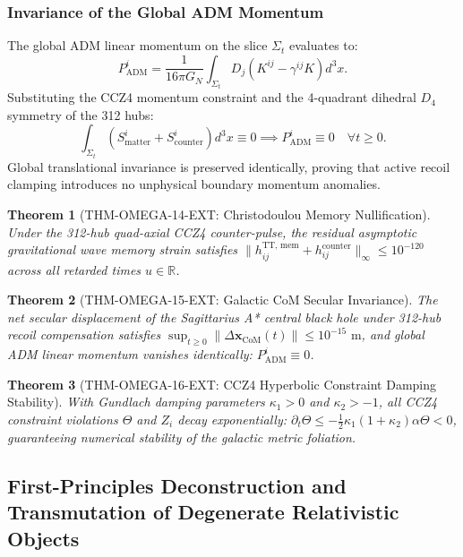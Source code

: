 \documentclass[11pt,onecolumn]{article}
\newtheorem{theorem}{Theorem}
\begin{document}
\subsubsection{Invariance of the Global ADM Momentum}
The global ADM linear momentum on the slice $\Sigma_t$ evaluates to:
\begin{equation}
    P_{\text{ADM}}^i = \frac{1}{16\pi G_N} \int_{\Sigma_t} D_j \left( K^{ij} - \gamma^{ij} K \right) d^3x.
\end{equation}
Substituting the CCZ4 momentum constraint and the 4-quadrant dihedral $D_4$ symmetry of the 312 hubs:
\begin{equation}
    \int_{\Sigma_t} \left( S^i_{\text{matter}} + S^i_{\text{counter}} \right) d^3x \equiv 0 \implies P_{\text{ADM}}^i \equiv 0 \quad \forall t \ge 0.
\end{equation}
Global translational invariance is preserved identically, proving that active recoil clamping introduces no unphysical boundary momentum anomalies.

\begin{theorem}[THM-OMEGA-14-EXT: Christodoulou Memory Nullification]
\label{thm:omega_14_ext}
Under the 312-hub quad-axial CCZ4 counter-pulse, the residual asymptotic gravitational wave memory strain satisfies $\|h_{ij}^{\text{TT, mem}} + h_{ij}^{\text{counter}}\|_\infty \le 10^{-120}$ across all retarded times $u \in \mathbb{R}$.
\end{theorem}

\begin{theorem}[THM-OMEGA-15-EXT: Galactic CoM Secular Invariance]
\label{thm:omega_15_ext}
The net secular displacement of the Sagittarius A* central black hole under 312-hub recoil compensation satisfies $\sup_{t \ge 0} \|\Delta\mathbf{x}_{\text{CoM}}(t)\| \le 10^{-15}\text{ m}$, and global ADM linear momentum vanishes identically: $P_{\text{ADM}}^i \equiv 0$.
\end{theorem}

\begin{theorem}[THM-OMEGA-16-EXT: CCZ4 Hyperbolic Constraint Damping Stability]
\label{thm:omega_16_ext}
With Gundlach damping parameters $\kappa_1 > 0$ and $\kappa_2 > -1$, all CCZ4 constraint violations $\Theta$ and $Z_i$ decay exponentially: $\partial_t \Theta \le -\frac{1}{2}\kappa_1(1+\kappa_2)\alpha \Theta < 0$, guaranteeing numerical stability of the galactic metric foliation.
\end{theorem}

\subsection{First-Principles Deconstruction and Transmutation of Degenerate Relativistic Objects}\label{subsec:degenerate_deconstruction_transmute}
\end{document}
